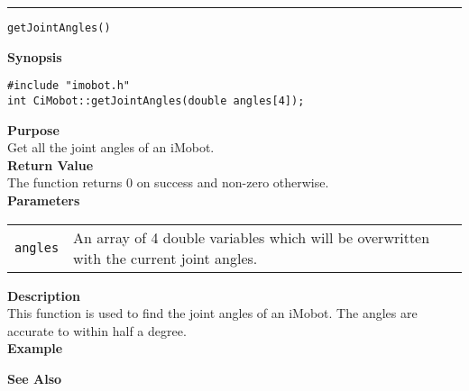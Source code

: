 \noindent
\vspace{5pt}
\rule{6.5in}{0.015in}
\noindent
{\LARGE \texttt{getJointAngles()}}\\
{}

\noindent
{\bf Synopsis}\\
\begin{verbatim}
#include "imobot.h"
int CiMobot::getJointAngles(double angles[4]);
\end{verbatim}

\noindent
{\bf Purpose}\\
Get all the joint angles of an iMobot.\\

\noindent
{\bf Return Value}\\
The function returns 0 on success and non-zero otherwise.\\

\noindent
{\bf Parameters}
\vspace{-0.1in}
\begin{description}
\item               
\begin{tabular}{p{15 mm}p{145 mm}}
\texttt{angles} & An array of 4 double variables which will be overwritten with the current joint angles.
\end{tabular}
\end{description}

\noindent
{\bf Description}\\
This function is used to find the joint angles of an iMobot. The angles are accurate to
within half a degree. \\

\noindent
{\bf Example}\\
\noindent

\noindent
{\bf See Also}\\


